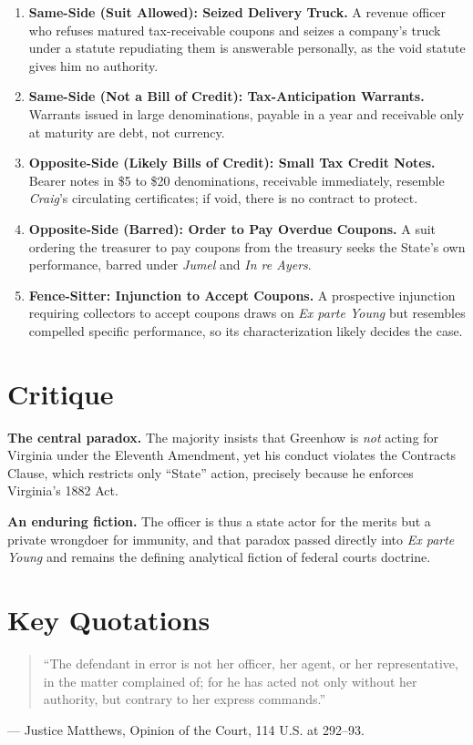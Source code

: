 \documentclass[12pt]{article}
\begin{document}
\begin{enumerate}
\item \textbf{Same-Side (Suit Allowed): Seized Delivery Truck.} A revenue officer who refuses matured tax-receivable coupons and seizes a company's truck under a statute repudiating them is answerable personally, as the void statute gives him no authority.
\item \textbf{Same-Side (Not a Bill of Credit): Tax-Anticipation Warrants.} Warrants issued in large denominations, payable in a year and receivable only at maturity are debt, not currency.
\item \textbf{Opposite-Side (Likely Bills of Credit): Small Tax Credit Notes.} Bearer notes in \$5 to \$20 denominations, receivable immediately, resemble \textit{Craig}'s circulating certificates; if void, there is no contract to protect.
\item \textbf{Opposite-Side (Barred): Order to Pay Overdue Coupons.} A suit ordering the treasurer to pay coupons from the treasury seeks the State's own performance, barred under \textit{Jumel} and \textit{In re Ayers}.
\item \textbf{Fence-Sitter: Injunction to Accept Coupons.} A prospective injunction requiring collectors to accept coupons draws on \textit{Ex parte Young} but resembles compelled specific performance, so its characterization likely decides the case.
\end{enumerate}

\section{Critique}

\textbf{The central paradox.} The majority insists that Greenhow is \textit{not} acting for Virginia under the Eleventh Amendment, yet his conduct violates the Contracts Clause, which restricts only ``State'' action, precisely because he enforces Virginia's 1882 Act.

\textbf{An enduring fiction.} The officer is thus a state actor for the merits but a private wrongdoer for immunity, and that paradox passed directly into \textit{Ex parte Young} and remains the defining analytical fiction of federal courts doctrine.

\section{Key Quotations}

\begin{quote}
``The defendant in error is not her officer, her agent, or her representative, in the matter complained of; for he has acted not only without her authority, but contrary to her express commands.''
\end{quote}
\noindent --- Justice Matthews, Opinion of the Court, 114 U.S. at 292--93.
\end{document}
